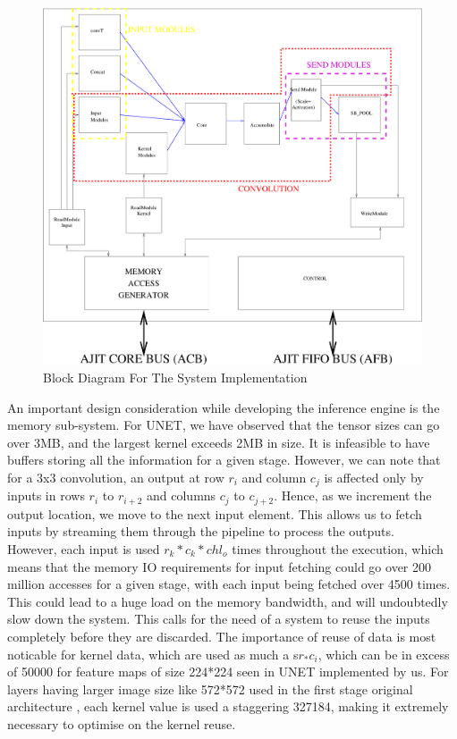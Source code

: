 \documentclass[a4paper,12pt, final]{report}
\begin{document}
\begin{figure}[h!]
    \centering
	\includegraphics[width=\textwidth]{updated_modules.pdf}
    \caption{Block Diagram For The System Implementation}
    \label{fig:block_dia}
\end{figure}

An important design consideration while developing the inference engine is the memory sub-system. For UNET, we have observed that the tensor sizes can go over 3MB, and the largest kernel exceeds 2MB in size. It is infeasible to have buffers storing all the information for a given stage. However, we can note that for a 3x3 convolution, an output at row $r_i$ and column $c_j$ is affected only by inputs in rows $r_{i}$ to $r_{i+2}$ and columns $c_{j}$ to $c_{j+2}$. Hence, as we increment the output location, we move to the next input element. This allows us to fetch inputs by streaming them through the pipeline to process the outputs.
\\

However, each input is used $r_k*c_k*chl_o$ times throughout the execution, which means that the memory IO requirements for input fetching could go over 200 million accesses for a given stage, with each input being fetched over 4500 times. This could lead to a huge load on the memory bandwidth, and will undoubtedly slow down the system. This calls for the need of a system to reuse the inputs completely before they are discarded. The importance of reuse of data is most noticable for kernel data, which are used as much a s$r_*c_i$, which can be in excess of 50000 for feature maps of size 224*224 seen in UNET implemented by us. For layers having larger image size like 572*572 used in the first stage original architecture \cite{UNET}, each kernel value is used a staggering 327184, making it extremely necessary to optimise on the kernel reuse.
\\
\end{document}
